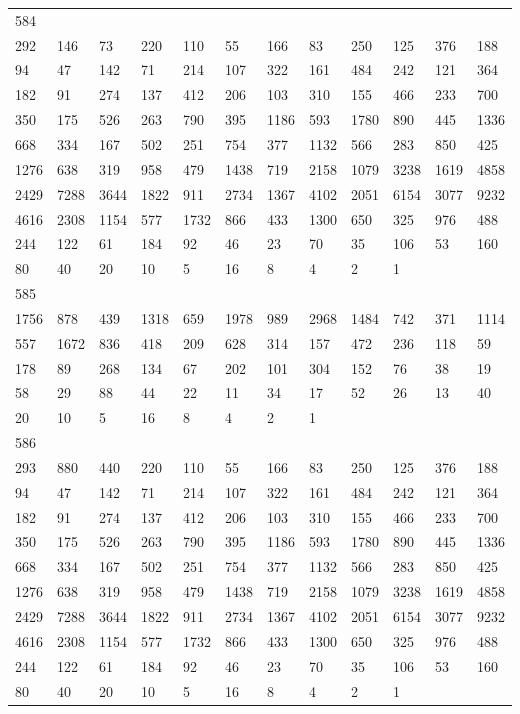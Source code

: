\begin{longtable}{llllllllllll}
584&&&&&&&&&&&\\
292& 146& 73& 220& 110& 55& 166& 83& 250& 125& 376& 188\\
94& 47& 142& 71& 214& 107& 322& 161& 484& 242& 121& 364\\
182& 91& 274& 137& 412& 206& 103& 310& 155& 466& 233& 700\\
350& 175& 526& 263& 790& 395& 1186& 593& 1780& 890& 445& 1336\\
668& 334& 167& 502& 251& 754& 377& 1132& 566& 283& 850& 425\\
1276& 638& 319& 958& 479& 1438& 719& 2158& 1079& 3238& 1619& 4858\\
2429& 7288& 3644& 1822& 911& 2734& 1367& 4102& 2051& 6154& 3077& 9232\\
4616& 2308& 1154& 577& 1732& 866& 433& 1300& 650& 325& 976& 488\\
244& 122& 61& 184& 92& 46& 23& 70& 35& 106& 53& 160\\
80& 40& 20& 10& 5& 16& 8& 4& 2& 1& \\

585&&&&&&&&&&&\\
1756& 878& 439& 1318& 659& 1978& 989& 2968& 1484& 742& 371& 1114\\
557& 1672& 836& 418& 209& 628& 314& 157& 472& 236& 118& 59\\
178& 89& 268& 134& 67& 202& 101& 304& 152& 76& 38& 19\\
58& 29& 88& 44& 22& 11& 34& 17& 52& 26& 13& 40\\
20& 10& 5& 16& 8& 4& 2& 1& \\

586&&&&&&&&&&&\\
293& 880& 440& 220& 110& 55& 166& 83& 250& 125& 376& 188\\
94& 47& 142& 71& 214& 107& 322& 161& 484& 242& 121& 364\\
182& 91& 274& 137& 412& 206& 103& 310& 155& 466& 233& 700\\
350& 175& 526& 263& 790& 395& 1186& 593& 1780& 890& 445& 1336\\
668& 334& 167& 502& 251& 754& 377& 1132& 566& 283& 850& 425\\
1276& 638& 319& 958& 479& 1438& 719& 2158& 1079& 3238& 1619& 4858\\
2429& 7288& 3644& 1822& 911& 2734& 1367& 4102& 2051& 6154& 3077& 9232\\
4616& 2308& 1154& 577& 1732& 866& 433& 1300& 650& 325& 976& 488\\
244& 122& 61& 184& 92& 46& 23& 70& 35& 106& 53& 160\\
80& 40& 20& 10& 5& 16& 8& 4& 2& 1& \\


\end{longtable}
